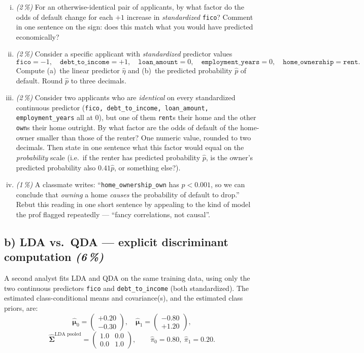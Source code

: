 \documentclass[11pt,a4paper]{article}
\newcommand{\subpoints}[1]{\textit{(#1\,\%)}}
\begin{document}
\begin{enumerate}[(i)]
  \item \subpoints{2} For an otherwise-identical pair of applicants, by what factor do the odds of default change for each $+1$ increase in \emph{standardized} \texttt{fico}? Comment in one sentence on the sign: does this match what you would have predicted economically?

  \item \subpoints{2} Consider a specific applicant with \emph{standardized} predictor values
  $$\texttt{fico} = -1,\quad \texttt{debt\_to\_income} = +1,\quad \texttt{loan\_amount} = 0,\quad \texttt{employment\_years} = 0,\quad \texttt{home\_ownership} = \texttt{rent}.$$
  Compute (a)~the linear predictor $\hat\eta$ and (b)~the predicted probability $\hat p$ of default. Round $\hat p$ to three decimals.

  \item \subpoints{2} Consider two applicants who are \emph{identical} on every standardized continuous predictor (\texttt{fico, debt\_to\_income, loan\_amount, employment\_years} all at $0$), but one of them \texttt{rent}s their home and the other \texttt{own}s their home outright. By what factor are the odds of default of the home-owner smaller than those of the renter? One numeric value, rounded to two decimals. Then state in one sentence what this factor would equal on the \emph{probability} scale (i.e.\ if the renter has predicted probability $\hat p$, is the owner's predicted probability also $0.41 \hat p$, or something else?).

  \item \subpoints{1} A classmate writes: ``\texttt{home\_ownership\_own} has $p < 0.001$, so we can conclude that \emph{owning} a home \emph{causes} the probability of default to drop.'' Rebut this reading in one short sentence by appealing to the kind of model the prof flagged repeatedly --- ``fancy correlations, not causal''.
\end{enumerate}

\subsection*{b) LDA vs.\ QDA --- explicit discriminant computation \subpoints{6}}

A second analyst fits LDA and QDA on the same training data, using only the two continuous predictors \texttt{fico} and \texttt{debt\_to\_income} (both standardized). The estimated class-conditional means and covariance(s), and the estimated class priors, are:
$$\hat{\bm\mu}_{0} = \begin{pmatrix} +0.20 \\ -0.30 \end{pmatrix}, \quad \hat{\bm\mu}_{1} = \begin{pmatrix} -0.80 \\ +1.20 \end{pmatrix},$$
$$\hat{\bm\Sigma}^{\text{LDA pooled}} = \begin{pmatrix} 1.0 & 0.0 \\ 0.0 & 1.0 \end{pmatrix}, \qquad \hat\pi_0 = 0.80,\ \hat\pi_1 = 0.20.$$
\end{document}
